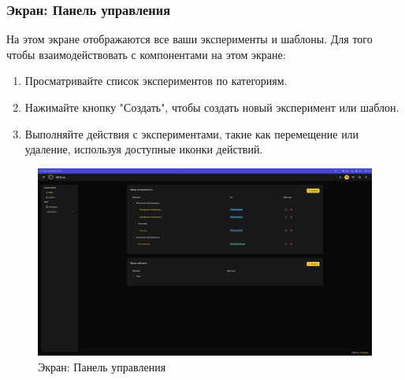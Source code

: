 \documentclass[a4paper,12pt,reqno]{article}
\begin{document}
\subsubsection{Экран: Панель управления}
На этом экране отображаются все ваши эксперименты и шаблоны. Для того чтобы взаимодействовать с компонентами на этом экране:
\begin{enumerate}
    \item Просматривайте список экспериментов по категориям.
    \item Нажимайте кнопку "Создать", чтобы создать новый эксперимент или шаблон.
    \item Выполняйте действия с экспериментами, такие как перемещение или удаление, используя доступные иконки действий.
\end{enumerate}
\begin{figure}[H]
    \centering
    \includegraphics[width=\textwidth]{RO/img/dashboard.png} %
    \caption{Экран: Панель управления}
    \label{fig:dashboard}
\end{figure}
\end{document}
